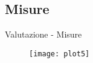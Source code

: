 \subsection{Misure}
\begin{frame}{Valutazione - Misure}
	\begin{figure}
	\texttt{[image: plot5]}
	\end{figure}
	
\end{frame}
